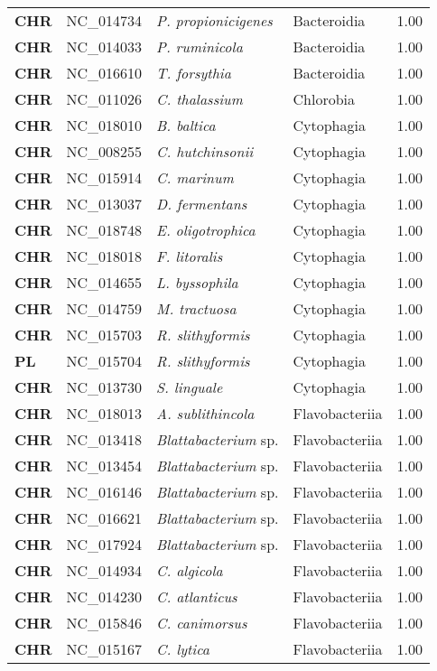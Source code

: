 \begin{adjustwidth}{-3cm}{2cm}
{\begin{supertabular}{>{\bfseries}l|p{0.1\textwidth}p{0.14\textwidth}l|l}
CHR & NC\_014734 & \textit{P. propionicigenes} & Bacteroidia & 1.00\\
CHR & NC\_014033 & \textit{P. ruminicola} & Bacteroidia & 1.00\\
CHR & NC\_016610 & \textit{T. forsythia} & Bacteroidia & 1.00\\
CHR & NC\_011026 & \textit{C. thalassium} & Chlorobia & 1.00\\
CHR & NC\_018010 & \textit{B. baltica} & Cytophagia & 1.00\\
CHR & NC\_008255 & \textit{C. hutchinsonii} & Cytophagia & 1.00\\
CHR & NC\_015914 & \textit{C. marinum} & Cytophagia & 1.00\\
CHR & NC\_013037 & \textit{D. fermentans} & Cytophagia & 1.00\\
CHR & NC\_018748 & \textit{E. oligotrophica} & Cytophagia & 1.00\\
CHR & NC\_018018 & \textit{F. litoralis} & Cytophagia & 1.00\\
CHR & NC\_014655 & \textit{L. byssophila} & Cytophagia & 1.00\\
CHR & NC\_014759 & \textit{M. tractuosa} & Cytophagia & 1.00\\
CHR & NC\_015703 & \textit{R. slithyformis} & Cytophagia & 1.00\\
PL & NC\_015704 & \textit{R. slithyformis} & Cytophagia & 1.00\\
CHR & NC\_013730 & \textit{S. linguale} & Cytophagia & 1.00\\
CHR & NC\_018013 & \textit{A. sublithincola} & Flavobacteriia & 1.00\\
CHR & NC\_013418 & \textit{Blattabacterium} sp. & Flavobacteriia & 1.00\\
CHR & NC\_013454 & \textit{Blattabacterium} sp. & Flavobacteriia & 1.00\\
CHR & NC\_016146 & \textit{Blattabacterium} sp. & Flavobacteriia & 1.00\\
CHR & NC\_016621 & \textit{Blattabacterium} sp. & Flavobacteriia & 1.00\\
CHR & NC\_017924 & \textit{Blattabacterium} sp. & Flavobacteriia & 1.00\\
CHR & NC\_014934 & \textit{C. algicola} & Flavobacteriia & 1.00\\
CHR & NC\_014230 & \textit{C. atlanticus} & Flavobacteriia & 1.00\\
CHR & NC\_015846 & \textit{C. canimorsus} & Flavobacteriia & 1.00\\
CHR & NC\_015167 & \textit{C. lytica} & Flavobacteriia & 1.00\\

\end{supertabular}}
\end{adjustwidth}
